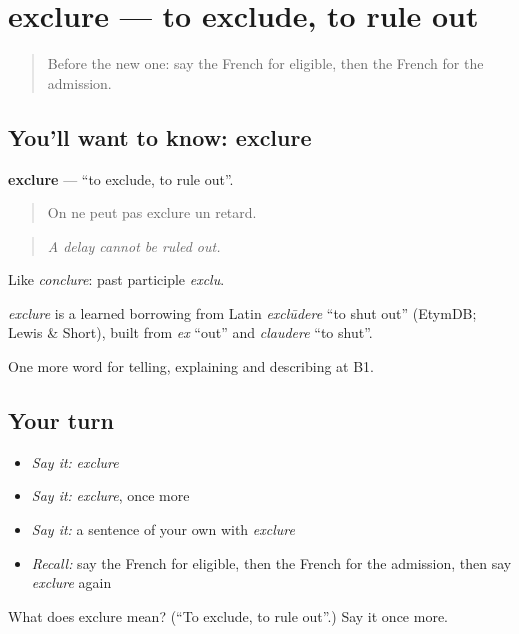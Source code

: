 \section[exclure]{exclure — to exclude, to rule out}

\label{lesson:FR-C383-exclure}



\begin{quote}
Before the new one: say the French for eligible, then the French for the admission.
\end{quote}

\subsection*{You'll want to know: exclure}
\textbf{exclure} — \textquotedblleft{}to exclude, to rule out\textquotedblright{}.

\begin{quote}
On ne peut pas exclure un retard.
\end{quote}

\begin{quote}
\emph{A delay cannot be ruled out.}
\end{quote}

Like \emph{conclure}: past participle \emph{exclu}.

\begin{cousinweb}
\emph{exclure} is a learned borrowing from Latin \emph{exclūdere} \textquotedblleft{}to shut out\textquotedblright{} (EtymDB; Lewis \& Short), built from \emph{ex} \textquotedblleft{}out\textquotedblright{} and \emph{claudere} \textquotedblleft{}to shut\textquotedblright{}.
\end{cousinweb}

\begin{grammarlens}[title={What you've built}]
One more word for telling, explaining and describing at B1.
\end{grammarlens}

\subsection*{Your turn}
\begin{itemize}
\raggedright
  \item \emph{Say it:} \emph{exclure}
  \item \emph{Say it:} \emph{exclure}, once more
  \item \emph{Say it:} a sentence of your own with \emph{exclure}
  \item \emph{Recall:} say the French for eligible, then the French for the admission, then say \emph{exclure} again
\end{itemize}

\begin{tcolorbox}[breakable,colback=teal!4,colframe=teal!35!black,title={Before you move on}]
What does exclure mean? (\textquotedblleft{}To exclude, to rule out\textquotedblright{}.) Say it once more.
\end{tcolorbox}
